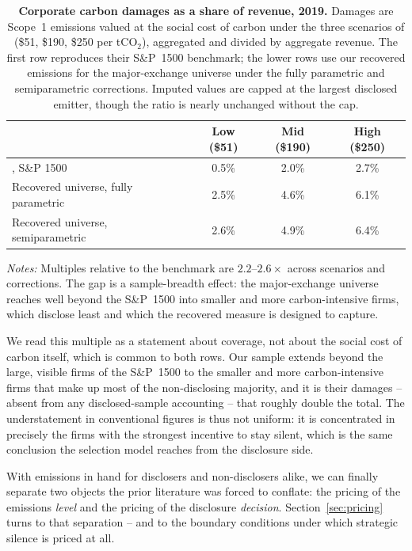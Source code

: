 \documentclass[a4paper,12pt]{article}
\newcommand{\citet}[1]{\textcite{#1}}
\begin{document}
\begin{table}[htbp]
\footnotesize\centering
\caption{\textbf{Corporate carbon damages as a share of revenue, 2019.} Damages
are Scope~1 emissions valued at the social cost of carbon under the three
scenarios of \citet{greenstone2023mandatory} (\$51, \$190, \$250 per tCO$_2$),
aggregated and divided by aggregate revenue. The first row reproduces their
S\&P~1500 benchmark; the lower rows use our recovered emissions for the
major-exchange universe under the fully parametric and semiparametric
corrections. Imputed values are capped at the largest disclosed emitter, though
the ratio is nearly unchanged without the cap.}
\label{tab:carbon_damages}
\begin{tabular}{lccc}
\toprule
 & Low (\$51) & Mid (\$190) & High (\$250) \\
\midrule
\citet{greenstone2023mandatory}, S\&P 1500 & 0.5\% & 2.0\% & 2.7\% \\
\midrule
Recovered universe, fully parametric & 2.5\% & 4.6\% & 6.1\% \\
Recovered universe, semiparametric   & 2.6\% & 4.9\% & 6.4\% \\
\bottomrule
\end{tabular}
\begin{flushleft}\footnotesize
\textit{Notes:} Multiples relative to the benchmark are $2.2$--$2.6\times$ across
scenarios and corrections. The gap is a sample-breadth effect: the major-exchange
universe reaches well beyond the S\&P~1500 into smaller and more carbon-intensive
firms, which disclose least and which the recovered measure is designed to
capture.
\end{flushleft}
\end{table}

We read this multiple as a statement about coverage, not about the social cost of carbon itself, which is common to both rows. Our sample extends beyond the large, visible firms of the S\&P~1500 to the smaller and more carbon-intensive firms that make up most of the non-disclosing majority, and it is their damages -- absent from any disclosed-sample accounting -- that roughly double the total. The understatement in conventional figures is thus not uniform: it is concentrated in precisely the firms with the strongest incentive to stay silent, which is the same conclusion the selection model reaches from the disclosure side.

With emissions in hand for disclosers and non-disclosers alike, we can finally separate two objects the prior literature was forced to conflate: the pricing of the emissions \emph{level} and the pricing of the disclosure \emph{decision}. Section~\ref{sec:pricing} turns to that separation -- and to the boundary conditions under which strategic silence is priced at all.
\end{document}
